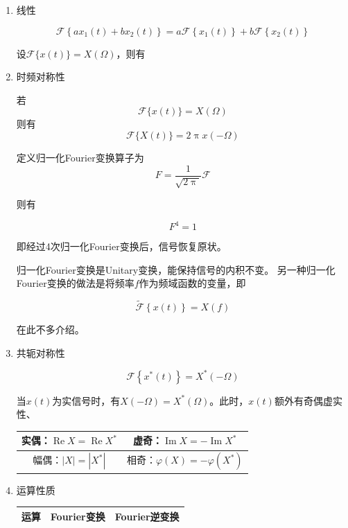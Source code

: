 \documentclass[UTF8,fontset=fandol,zihao=5]{ctexart}
\newcommand{\FF}{\mathcal{F}}
\newcommand{\RRe}{\operatorname{Re}}
\newcommand{\IIm}{\operatorname{Im}}
\begin{document}
\begin{enumerate}
  \item 线性
  
  \[
  \FF \left\{ ax_1(t) + bx_2(t) \right\} = a \FF \left\{ x_1(t) \right\} + b \FF \left\{ x_2(t) \right\} 
  \]     

设$\displaystyle \FF \{ x(t) \} = X(\varOmega)$，则有

  \item 时频对称性
  
  若
  \[
  \FF \{ x(t) \} = X(\varOmega)
  \]
  则有
  \[
  \FF \{ X(t) \} = 2 \uppi x(-\varOmega)
  \]

  \begin{methodbox}[【拓展】归一化Fourier变换]

    定义归一化Fourier变换算子为
    \[
    F=\frac{1}{\sqrt{2\uppi}}\FF
    \]

    则有

    \[
    F^4=1
    \]

    即经过4次归一化Fourier变换后，信号恢复原状。

    归一化Fourier变换是Unitary变换，能保持信号的内积不变。
    另一种归一化Fourier变换的做法是将频率$f$作为频域函数的变量，即

    \[
    \tilde{\FF} \left\{x(t)\right\} = X(f) 
    \]

    在此不多介绍。
  \end{methodbox}

  \item 共轭对称性
  
  \[
  \FF \left\{ x^\ast(t) \right\} = X^\ast(-\varOmega)
  \]

  当$x(t)$为实信号时，有$\displaystyle X(-\varOmega) = X^\ast(\varOmega)$。此时，$x(t)$额外有奇偶虚实性、

    \begin{center}
    \renewcommand{\arraystretch}{1.5}
    \begin{tabular}{|c|c|}
    \hline
    实偶：$\RRe X=\RRe X^\ast$
    &
    虚奇：$\IIm X=-\IIm X^\ast$
    \\
    \hline
    幅偶：$|X|=|X^\ast|$
    &
    相奇：$\varphi(X)=-\varphi(X^\ast)$
    \\
    \hline
    \end{tabular}
    \end{center}

  \item 运算性质
    \begin{center}
    \begin{tabularx}{0.98\textwidth}{>{\bfseries}p{1.5cm}X X}
    \toprule
    运算 & Fourier变换 & Fourier逆变换 \\
    \midrule


\end{tabularx}
\end{center}
\end{enumerate}
\end{document}

